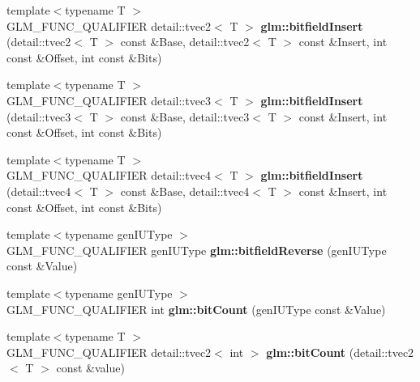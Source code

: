 \begin{DoxyCompactItemize}
\item 
\hypertarget{namespaceglm_a13eb4b03e07aff8b95d59079ba5790e3}{{\footnotesize template$<$typename T $>$ }\\\-G\-L\-M\-\_\-\-F\-U\-N\-C\-\_\-\-Q\-U\-A\-L\-I\-F\-I\-E\-R \*
detail\-::tvec2$<$ \-T $>$ {\bfseries glm\-::bitfield\-Insert} (detail\-::tvec2$<$ \-T $>$ const \&\-Base, detail\-::tvec2$<$ \-T $>$ const \&\-Insert, int const \&\-Offset, int const \&\-Bits)}\label{namespaceglm_a13eb4b03e07aff8b95d59079ba5790e3}

\item 
\hypertarget{namespaceglm_ac46b5eb28b597fb612dd0cc982bc97de}{{\footnotesize template$<$typename T $>$ }\\\-G\-L\-M\-\_\-\-F\-U\-N\-C\-\_\-\-Q\-U\-A\-L\-I\-F\-I\-E\-R \*
detail\-::tvec3$<$ \-T $>$ {\bfseries glm\-::bitfield\-Insert} (detail\-::tvec3$<$ \-T $>$ const \&\-Base, detail\-::tvec3$<$ \-T $>$ const \&\-Insert, int const \&\-Offset, int const \&\-Bits)}\label{namespaceglm_ac46b5eb28b597fb612dd0cc982bc97de}

\item 
\hypertarget{namespaceglm_a84dd7fb4a6325934c77f005416b56eb8}{{\footnotesize template$<$typename T $>$ }\\\-G\-L\-M\-\_\-\-F\-U\-N\-C\-\_\-\-Q\-U\-A\-L\-I\-F\-I\-E\-R \*
detail\-::tvec4$<$ \-T $>$ {\bfseries glm\-::bitfield\-Insert} (detail\-::tvec4$<$ \-T $>$ const \&\-Base, detail\-::tvec4$<$ \-T $>$ const \&\-Insert, int const \&\-Offset, int const \&\-Bits)}\label{namespaceglm_a84dd7fb4a6325934c77f005416b56eb8}

\item 
\hypertarget{namespaceglm_a81b8447847f030968934d7f30005b240}{{\footnotesize template$<$typename gen\-I\-U\-Type $>$ }\\\-G\-L\-M\-\_\-\-F\-U\-N\-C\-\_\-\-Q\-U\-A\-L\-I\-F\-I\-E\-R gen\-I\-U\-Type {\bfseries glm\-::bitfield\-Reverse} (gen\-I\-U\-Type const \&\-Value)}\label{namespaceglm_a81b8447847f030968934d7f30005b240}

\item 
\hypertarget{namespaceglm_a3327aadbf9816a3f8b182cbd9bcb1aac}{{\footnotesize template$<$typename gen\-I\-U\-Type $>$ }\\\-G\-L\-M\-\_\-\-F\-U\-N\-C\-\_\-\-Q\-U\-A\-L\-I\-F\-I\-E\-R int {\bfseries glm\-::bit\-Count} (gen\-I\-U\-Type const \&\-Value)}\label{namespaceglm_a3327aadbf9816a3f8b182cbd9bcb1aac}

\item 
\hypertarget{namespaceglm_ac28cce9c64a477f36cda400e50d0f6a2}{{\footnotesize template$<$typename T $>$ }\\\-G\-L\-M\-\_\-\-F\-U\-N\-C\-\_\-\-Q\-U\-A\-L\-I\-F\-I\-E\-R \*
detail\-::tvec2$<$ int $>$ {\bfseries glm\-::bit\-Count} (detail\-::tvec2$<$ \-T $>$ const \&value)}\label{namespaceglm_ac28cce9c64a477f36cda400e50d0f6a2}


\end{DoxyCompactItemize}
